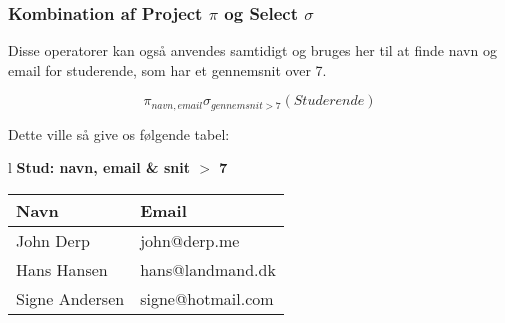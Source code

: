 \subsubsection{Kombination af Project $\pi$ og Select $\sigma$}
Disse operatorer kan også anvendes samtidigt og bruges her til at finde navn og email for studerende, som har et gennemsnit over 7.

\begin{equation}
\pi_{navn, email}\sigma_{gennemsnit>7}(Studerende)
\end{equation}

Dette ville så give os følgende tabel:

\begin{center}
	\begin{tabular}{l}\label{tab:stud}
		\textbf{\large Stud: navn, email \& snit $>$ 7}	\\
		\begin{tabular}{|l|l|}		
			\hline
			\textbf{Navn}&\textbf{Email}\\
			\hline
			John Derp		&  john@derp.me		\\
			\hline
			Hans Hansen		&  hans@landmand.dk		\\
			\hline
			Signe Andersen	& signe@hotmail.com		\\
			\hline
		\end{tabular}
	\end{tabular}
\end{center}





















